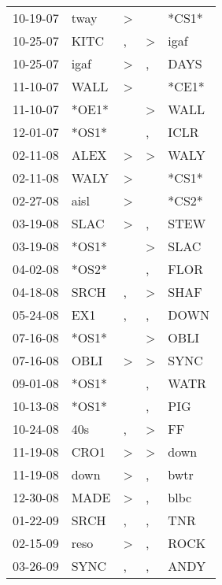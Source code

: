\begin{supertabular}{lllll}
 10-19-07 &   tway &  \textgreater &                  &  *CS1* \\
 10-25-07 &   KITC &             , &     \textgreater &   igaf \\
 10-25-07 &   igaf &  \textgreater &                , &   DAYS \\
 11-10-07 &   WALL &  \textgreater &                  &  *CE1* \\
 11-10-07 &  *OE1* &               &     \textgreater &   WALL \\
 12-01-07 &  *OS1* &               &                , &   ICLR \\
 02-11-08 &   ALEX &  \textgreater &     \textgreater &   WALY \\
 02-11-08 &   WALY &  \textgreater &                  &  *CS1* \\
 02-27-08 &   aisl &  \textgreater &                  &  *CS2* \\
 03-19-08 &   SLAC &  \textgreater &                , &   STEW \\
 03-19-08 &  *OS1* &               &     \textgreater &   SLAC \\
 04-02-08 &  *OS2* &               &                , &   FLOR \\
 04-18-08 &   SRCH &             , &     \textgreater &   SHAF \\
 05-24-08 &    EX1 &             , &                , &   DOWN \\
 07-16-08 &  *OS1* &               &     \textgreater &   OBLI \\
 07-16-08 &   OBLI &  \textgreater &     \textgreater &   SYNC \\
 09-01-08 &  *OS1* &               &                , &   WATR \\
 10-13-08 &  *OS1* &               &                , &    PIG \\
 10-24-08 &    40s &             , &     \textgreater &     FF \\
 11-19-08 &   CRO1 &  \textgreater &     \textgreater &   down \\
 11-19-08 &   down &  \textgreater &                , &   bwtr \\
 12-30-08 &   MADE &  \textgreater &                , &   blbc \\
 01-22-09 &   SRCH &             , &                , &    TNR \\
 02-15-09 &   reso &  \textgreater &                , &   ROCK \\
 03-26-09 &   SYNC &             , &                , &   ANDY \\

\end{supertabular}
